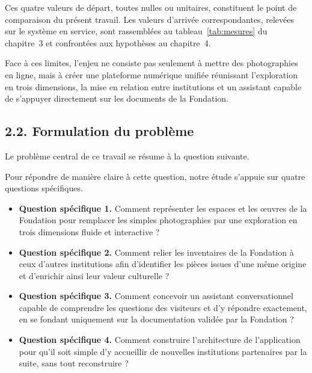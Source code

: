 Ces quatre valeurs de départ, toutes nulles ou unitaires, constituent le point
de comparaison du présent travail. Les valeurs d'arrivée correspondantes,
relevées sur le système en service, sont rassemblées au
tableau~\ref{tab:mesures} du chapitre~3 et confrontées aux hypothèses au
chapitre~4.

Face à ces limites, l'enjeu ne consiste pas seulement à mettre des photographies
en ligne, mais à créer une plateforme numérique unifiée réunissant l'exploration
en trois dimensions, la mise en relation entre institutions et un assistant
capable de s'appuyer directement sur les documents de la Fondation.

\subsection*{2.2. Formulation du problème}

Le problème central de ce travail se résume à la question suivante.


Pour répondre de manière claire à cette question, notre étude s'appuie sur
quatre questions spécifiques.

\begin{itemize}[label={},leftmargin=0pt,itemsep=5pt,topsep=4pt,parsep=0pt]
  \item \textbf{Question spécifique 1.} Comment représenter les espaces et les œuvres de la
        Fondation pour remplacer les simples photographies par une exploration
        en trois dimensions fluide et interactive ?

  \item \textbf{Question spécifique 2.} Comment relier les inventaires de la Fondation à ceux
        d'autres institutions afin d'identifier les pièces issues d'une même
        origine et d'enrichir ainsi leur valeur culturelle ?

  \item \textbf{Question spécifique 3.} Comment concevoir un assistant conversationnel capable de
        comprendre les questions des visiteurs et d'y répondre exactement, en se
        fondant uniquement sur la documentation validée par la Fondation ?

  \item \textbf{Question spécifique 4.} Comment construire l'architecture de l'application pour
        qu'il soit simple d'y accueillir de nouvelles institutions partenaires
        par la suite, sans tout reconstruire ?
\end{itemize}

